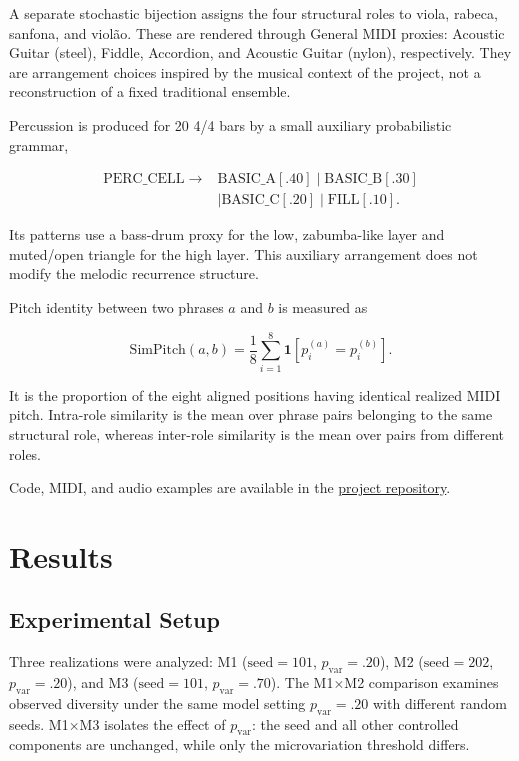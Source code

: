 \documentclass{article}
\begin{document}
A separate stochastic bijection assigns the four structural roles to viola, rabeca, sanfona, and viol\~ao. These are rendered through General MIDI proxies: Acoustic Guitar (steel), Fiddle, Accordion, and Acoustic Guitar (nylon), respectively. They are arrangement choices inspired by the musical context of the project, not a reconstruction of a fixed traditional ensemble.

Percussion is produced for 20 4/4 bars by a small auxiliary probabilistic grammar,

\begin{equation}
\begin{aligned}
\mathrm{PERC\_CELL}\rightarrow{}&\mathrm{BASIC\_A}[.40]\mid
\mathrm{BASIC\_B}[.30]\\
&\mid\mathrm{BASIC\_C}[.20]\mid
\mathrm{FILL}[.10].
\end{aligned}
\end{equation}

Its patterns use a bass-drum proxy for the low, zabumba-like layer and muted/open triangle for the high layer. This auxiliary arrangement does not modify the melodic recurrence structure.

Pitch identity between two phrases \(a\) and \(b\) is measured as

\begin{equation}
\mathrm{SimPitch}(a,b)=
\frac{1}{8}\sum_{i=1}^{8}
\mathbf{1}[p_i^{(a)}=p_i^{(b)}].
\end{equation}

It is the proportion of the eight aligned positions having identical realized MIDI pitch. Intra-role similarity is the mean over phrase pairs belonging to the same structural role, whereas inter-role similarity is the mean over pairs from different roles.

Code, MIDI, and audio examples are available in the \href{https://github.com/YuriDants/tp1-generative-music}{project repository}.

\section{Results}\label{sec:results}

\subsection{Experimental Setup}\label{subsec:experimental_setup}

Three realizations were analyzed: M1 (\(\mathrm{seed}=101\), \(p_{\mathrm{var}}=.20\)), M2 (\(\mathrm{seed}=202\), \(p_{\mathrm{var}}=.20\)), and M3 (\(\mathrm{seed}=101\), \(p_{\mathrm{var}}=.70\)). The M1$\times$M2 comparison examines observed diversity under the same model setting \(p_{\mathrm{var}}=.20\) with different random seeds. M1$\times$M3 isolates the effect of \(p_{\mathrm{var}}\): the seed and all other controlled components are unchanged, while only the microvariation threshold differs.
\end{document}
